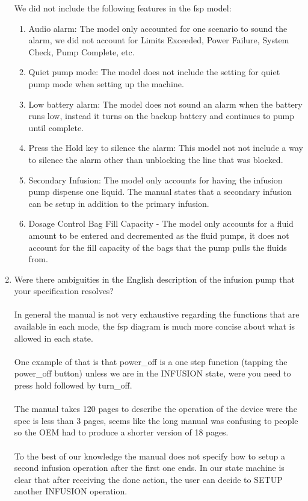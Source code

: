 ﻿\documentclass{article}
\begin{document}
\begin{enumerate}
We did not include the following features in the fsp model: 
\begin{enumerate}
\item Audio alarm: The model only accounted for one scenario to sound the alarm, we did not account for Limits Exceeded, Power Failure, System Check, Pump Complete, etc. \\
\item Quiet pump mode: The model does not include the setting for quiet pump mode when setting up the machine. \\
\item Low battery alarm: The model does not sound an alarm when the battery runs low, instead it turns on the backup battery and continues to pump until complete.\\
\item Press the Hold key to silence the alarm: This model not not include a way to silence the alarm other than unblocking the line that was blocked.   
\item Secondary Infusion: The model only accounts for having the infusion pump dispense one liquid. The manual states that a secondary infusion can be setup in addition to the primary infusion. 
\item Dosage Control Bag Fill Capacity - The model only accounts for a fluid amount to be entered and decremented as the fluid pumps, it does not account for the fill capacity of the bags that the pump pulls the fluids from. 
  \end{enumerate}


    \item Were there ambiguities in the English description of the infusion pump that your specification resolves? \\
\\
In general the manual is not very exhaustive regarding the functions that are available in each mode, the fsp diagram is much more concise about what is allowed in each state. \\
\\
One example of that is that power\_off is a one step function (tapping the power\_off button) unless we are in the INFUSION state, were you need to press hold followed by turn\_off.\\
\\
The manual takes 120 pages to describe the operation of the device were the spec is less than 3 pages, seems like the long manual was confusing to people so the OEM had to produce a shorter version of 18 pages.\\
\\
To the best of our knowledge the manual does not specify how to setup a second infusion operation after the first one ends. In our state machine is clear that after receiving the done action, the user can decide to SETUP another INFUSION operation.\\


\end{enumerate}
\end{document}
